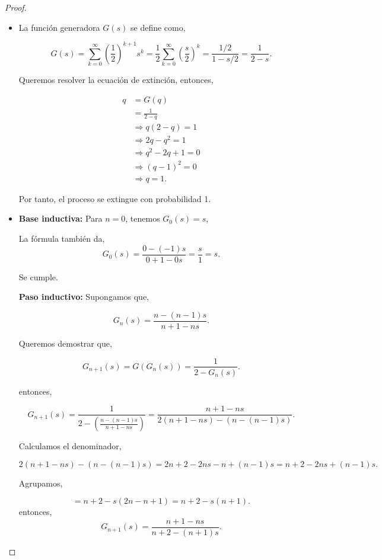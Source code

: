 \documentclass{article}
\begin{document}
\begin{proof}
\begin{itemize}
\item[(a)] 

La función generadora \( G(s) \) se define como,

\[
G(s) = \sum_{k=0}^{\infty} \left(\frac{1}{2}\right)^{k+1} s^k = \frac{1}{2} \sum_{k=0}^{\infty} \left(\frac{s}{2}\right)^k = \frac{1/2}{1 - s/2} = \frac{1}{2 - s}.
\]

Queremos resolver la ecuación de extinción, entonces,

\begin{align*}
q &= G(q) \\
&= \frac{1}{2 - q} \\
&\Rightarrow q(2 - q) = 1 \\
&\Rightarrow 2q - q^2 = 1 \\
&\Rightarrow q^2 - 2q + 1 = 0 \\
&\Rightarrow (q - 1)^2 = 0 \\
&\Rightarrow q = 1.
\end{align*}
    



Por tanto, el proceso se extingue con probabilidad 1.

\item[(b)]

\textbf{Base inductiva:} Para \( n = 0 \), tenemos \( G_0(s) = s \),

La fórmula también da,
\[
G_0(s) = \frac{0 - (-1)s}{0 + 1 - 0s} = \frac{s}{1} = s.
\]

Se cumple.

\textbf{Paso inductivo:} Supongamos que,

\[
G_n(s) = \frac{n - (n-1)s}{n + 1 - ns}.
\]

Queremos demostrar que,

\[
G_{n+1}(s) = G(G_n(s)) = \frac{1}{2 - G_n(s)}.
\]

entonces,

\[
G_{n+1}(s) = \frac{1}{2 - \left( \frac{n - (n-1)s}{n + 1 - ns} \right)} = \frac{n + 1 - ns}{2(n + 1 - ns) - (n - (n-1)s)}.
\]

Calculamos el denominador,

\[
2(n + 1 - ns) - (n - (n - 1)s) = 2n + 2 - 2ns - n + (n - 1)s = n + 2 - 2ns + (n - 1)s.
\]

Agrupamos,

\[
= n + 2 - s(2n - n + 1)
= n + 2 - s(n + 1).
\]
entonces,
\[
G_{n+1}(s) = \frac{n + 1 - ns}{n + 2 - (n + 1)s}.
\]


\end{itemize}
\end{proof}
\end{document}
